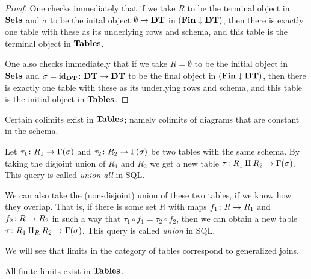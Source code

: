 \documentclass{amsart}
\def\DT{{\bf DT}}
\def\Tables{{\bf Tables}}
\def\Fin{{\bf Fin}}
\begin{document}
\begin{proof}

One checks immediately that if we take $R$ to be the terminal object in ${\bf Sets}$ and $\sigma$ to be the inital object $\emptyset\to\DT$ in $(\Fin\down\DT)$, then there is exactly one table with these as its underlying rows and schema, and this table is the terminal object in $\Tables$.

One also checks immediately that if we take $R=\emptyset$ to be the initial object in ${\bf Sets}$ and $\sigma=\id_{\DT}\taking\DT\to\DT$ to be the final object in $(\Fin\down\DT)$, then there is exactly one table with these as its underlying rows and schema, and this table is the initial object in $\Tables$.

\end{proof}

Certain colimits exist in $\Tables$; namely colimits of diagrams that are constant in the schema.

\begin{construction}

Let $\tau_1\colon R_1\rightarrow\Gamma(\sigma)$ and $\tau_2\colon R_2\rightarrow\Gamma(\sigma)$ be two tables with the same schema.  By taking the disjoint union of $R_1$ and $R_2$ we get a new table $\tau\colon R_1\amalg R_2\rightarrow\Gamma(\sigma)$.  This query is called {\em union all} in SQL.  

We can also take the (non-disjoint) union of these two tables, if we know how they overlap.  That is, if there is some set $R$ with maps $f_1\colon R\rightarrow R_1$ and $f_2\colon R\rightarrow R_2$ in such a way that $\tau_1\circ f_1=\tau_2\circ f_2$, then we can obtain a new table $\tau\colon R_1\amalg_RR_2\rightarrow\Gamma(\sigma)$.  This query is called {\em union} in SQL.

\end{construction}

We will see that limits in the category of tables correspond to generalized joins.

\begin{proposition}\label{finite limits exist}

All finite limits exist in $\Tables$.

\end{proposition}
\end{document}

